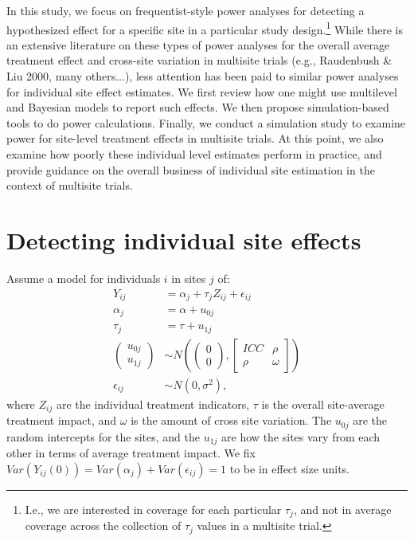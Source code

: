 \documentclass[]{article}
\begin{document}
In this study, we focus on frequentist-style power analyses for detecting a hypothesized effect for a specific site in a particular study design.\footnote{I.e., we are interested in coverage for each particular $\tau_j$, and not in average coverage across the collection of $\tau_j$ values in a multisite trial.}
While there is an extensive literature on these types of power analyses for the overall average treatment effect and cross-site variation in multisite trials (e.g., Raudenbush \& Liu 2000, many others...), less attention has been paid to similar power analyses for individual site effect estimates.
We first review how one might use multilevel and Bayesian models to report such effects.
We then propose simulation-based tools to do power calculations.
Finally, we conduct a simulation study to examine power for site-level treatment effects in multisite trials.
At this point, we also examine how poorly these individual level estimates perform in practice, and provide guidance on the overall business of individual site estimation in the context of multisite trials.


\section{Detecting individual site effects}

Assume a model for individuals $i$ in sites $j$ of: 
\begin{align*}
	Y_{ij} &= \alpha_j + \tau_j Z_{ij} + \epsilon_{ij} \\
	\alpha_j &= \alpha + u_{0j} \\
	\tau_j &= \tau + u_{1j} \\
	\begin{pmatrix}
		u_{0j} \\ u_{1j}
	\end{pmatrix} &\sim N\left(
	\begin{pmatrix}
		0 \\ 0
	\end{pmatrix}, 
	\begin{bmatrix}
		ICC & \rho \\ \rho & \omega
	\end{bmatrix}\right) \\
	\epsilon_{ij} &\sim N(0, \sigma^2) ,
\end{align*}
where $Z_{ij}$ are the individual treatment indicators, $\tau$ is the overall site-average treatment impact, and $\omega$ is the amount of cross site variation.
The $u_{0j}$ are the random intercepts for the sites, and the $u_{1j}$ are how the sites vary from each other in terms of average treatment impact.
We fix  $Var(Y_{ij}(0)) = Var(\alpha_j) + Var(\epsilon_{ij}) = 1$ to be in effect size units.
\end{document}

